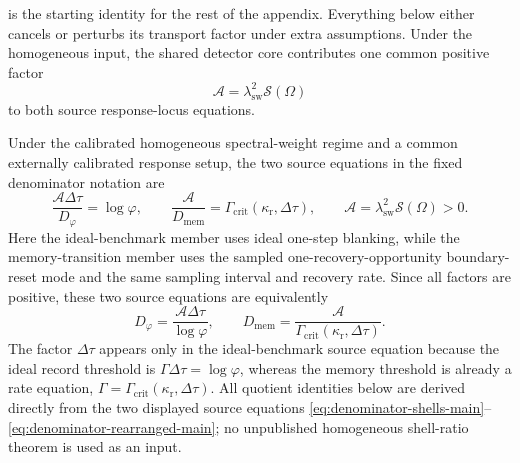  is the starting identity for the rest of the
appendix. Everything below either cancels or perturbs its transport factor
under extra assumptions. Under the homogeneous input, the shared detector core
contributes one common positive factor
\[
\mathcal A=\lambda_{\mathrm{sw}}^2\mathcal S(\Omega)
\]
to both source response-locus equations.

Under the calibrated homogeneous spectral-weight regime and a common externally
calibrated response setup, the two source equations in the fixed denominator
notation are
\begin{equation}\label{eq:denominator-shells-main}
\frac{\mathcal A\Delta\tau}{D_\varphi}=\log\varphi,
\qquad
\frac{\mathcal A}{D_{\mathrm{mem}}}
=\Gamma_{\mathrm{crit}}(\kappa_{\mathrm r},\Delta\tau),
\qquad
\mathcal A=\lambda_{\mathrm{sw}}^2\mathcal S(\Omega)>0 .
\end{equation}
Here the ideal-benchmark member uses ideal one-step blanking, while the
memory-transition member uses the sampled one-recovery-opportunity
boundary-reset mode and the same sampling interval and recovery rate. Since all
factors are positive, these two source equations are equivalently
\begin{equation}\label{eq:denominator-rearranged-main}
D_\varphi=\frac{\mathcal A\Delta\tau}{\log\varphi},
\qquad
D_{\mathrm{mem}}=\frac{\mathcal A}{\Gamma_{\mathrm{crit}}(\kappa_{\mathrm r},\Delta\tau)} .
\end{equation}
The factor $\Delta\tau$ appears only in the ideal-benchmark source equation
because the ideal record threshold is $\Gamma\Delta\tau=\log\varphi$, whereas
the memory threshold is already a rate equation,
$\Gamma=\Gamma_{\mathrm{crit}}(\kappa_{\mathrm r},\Delta\tau)$.
All quotient identities below are derived directly from the two displayed
source equations \eqref{eq:denominator-shells-main}--\eqref{eq:denominator-rearranged-main};
no unpublished homogeneous shell-ratio theorem is used as an input.

